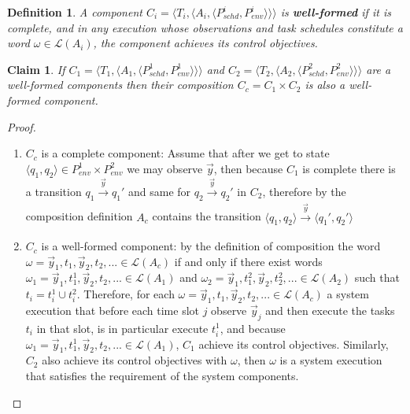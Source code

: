 \documentclass[ twoside, 12pt ]{article}
\newtheorem{dfn}{Definition} %
\newtheorem{claim}[thm]{Claim}
\begin{document}
\begin{dfn}
    \label{thm:well-formed}
    A component $C_i= \langle T_i, \langle A_i, \langle P_{schd}^i, P_{env}^i\rangle\rangle\rangle$ is \textbf{well-formed} if it is complete, and in any execution whose observations and task schedules constitute a word $\omega \in \mathcal{L}(A_i)$, the component achieves its control objectives.
\end{dfn}

\begin{claim}
    \label{thm:valid_composition}
    If $C_1=\langle T_1, \langle A_1, \langle P_{schd}^1, P_{env}^1\rangle\rangle\rangle$ and $C_2=\langle T_2, \langle A_2, \langle P_{schd}^2, P_{env}^2\rangle\rangle\rangle$ are a well-formed components then their composition $C_c=C_1 \times C_2$ is also a well-formed component.
\end{claim}
\begin{proof}
    \begin{enumerate}
        
        \item $C_c$ is a complete component: Assume that after we get to state $\langle q_1 , q_2 \rangle \in P_{env}^1 \times P_{env}^2$ we may observe $\vec{y}$, then because $C_1$ is complete there is a transition $q_1 \xrightarrow[]{\vec{y}} q_1'$ and same for $q_2 \xrightarrow[]{\vec{y}} q_2'$ in $C_2$, therefore by the composition definition $A_c$ contains the transition $\langle q_1 , q_2 \rangle \xrightarrow[]{\vec{y}} \langle q_1' , q_2' \rangle$
        
        \item $C_c$ is a well-formed component: by the definition of composition the word $\omega= \vec{y}_1 , t_1 , \vec{y}_2 , t_2, ... \in \mathcal{L}(A_c)$ if and only if there exist words $\omega_1= \vec{y}_1 , t_1^1 , \vec{y}_2, t_2, ... \in \mathcal{L}(A_1)$ and $\omega_2= \vec{y}_1 , t_1^2 , \vec{y}_2 , t_2^2, ... \in \mathcal{L}(A_2)$ such that $t_i = t_i^1 \cup t_i^2$. 
        Therefore, for each $\omega = \vec{y}_1 , t_1 , \vec{y}_2 , t_2, ... \in \mathcal{L}(A_c)$ a system execution that before each time slot $j$ observe $\vec{y}_j$ and then execute the tasks $t_i$ in that slot, is in particular execute $t_i^1$, and because $\omega_1= \vec{y}_1 , t_1^1 , \vec{y}_2 , t_2, ... \in \mathcal{L}(A_1)$, $C_1$ achieve its control objectives. Similarly, $C_2$ also achieve its control objectives with $\omega$, then $\omega$ is a system execution that satisfies the requirement of the system components.
        
    \end{enumerate}
\end{proof}
\end{document}
